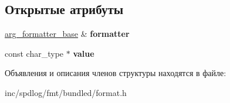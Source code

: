\subsection*{Открытые атрибуты}
\begin{DoxyCompactItemize}
\item 
\mbox{\label{structinternal_1_1arg__formatter__base_1_1cstring__spec__handler_a9f6a3337c1c80ce032aec3d8d2ab5afd}} 
\hyperlink{classinternal_1_1arg__formatter__base}{arg\+\_\+formatter\+\_\+base} \& {\bfseries formatter}
\item 
\mbox{\label{structinternal_1_1arg__formatter__base_1_1cstring__spec__handler_aa220787684662cced62bf13d75c24bfd}} 
const char\+\_\+type $\ast$ {\bfseries value}
\end{DoxyCompactItemize}


Объявления и описания членов структуры находятся в файле\+:\begin{DoxyCompactItemize}
\item 
inc/spdlog/fmt/bundled/format.\+h\end{DoxyCompactItemize}
